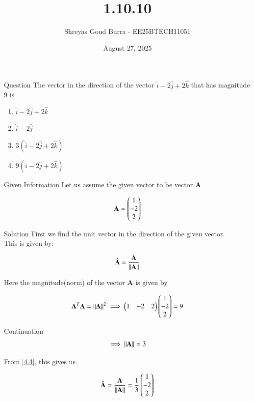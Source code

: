 \documentclass{beamer}
\title %
{1.10.10}
\date{August 27, 2025}
\author 
{Shreyas Goud Burra - EE25BTECH11051}
\begin{document}
\frame{\titlepage}
\begin{frame}{Question}
The vector in the direction of the vector $\hat{i} - 2\hat{j} + 2\hat{k}$ that has magnitude $9$ is
\begin{enumerate}[label=(\alph*)]
    \item $\hat{i}-2\hat{j}+2\hat{k}$
    \item $\hat{i}-2\hat{j}$
    \item $3(\hat{i}-2\hat{j}+2\hat{k})$
    \item $9(\hat{i}-2\hat{j}+2\hat{k})$
\end{enumerate}

\end{frame}

\begin{frame}{Given Information}
    Let us assume the given vector to be vector \textbf{A}

\begin{align}
    \textbf{A} = \begin{pmatrix}1 \\ -2 \\ 2\end{pmatrix}
    \label{4.1}
\end{align}

\end{frame}
\begin{frame}{Solution}
    First we find the unit vector in the direction of the given vector.\\
This is given by:

\begin{align}
    \hat{\textbf{A}} = \frac{\textbf{A}}{\left\lVert\textbf{A}\right\rVert}
    \label{4.2}
\end{align}

Here the magnitude(norm) of the vector \textbf{A} is given by

\begin{align}
    \textbf{A}^T\textbf{A} = \left\lVert\textbf{A}\right\rVert^2
    \label{4.3}
    \implies \begin{pmatrix}1 & -2 & 2\end{pmatrix} \begin{pmatrix}1 \\ -2 \\ 2\end{pmatrix} = 9
\end{align}
\end{frame}

\begin{frame}{Continuation}
\begin{align}
    \implies \left\lVert\textbf{A}\right\rVert = 3
    \label{4.4}
\end{align}

From \ref{4.4}, this gives us

\begin{align}
    \hat{\textbf{A}} = \frac{\textbf{A}}{\left\lVert\textbf{A}\right\rVert} = \frac{1}{3} \begin{pmatrix}1 \\ -2 \\ 2\end{pmatrix}
    \label{4.5}
\end{align}
\end{frame}
\end{document}
